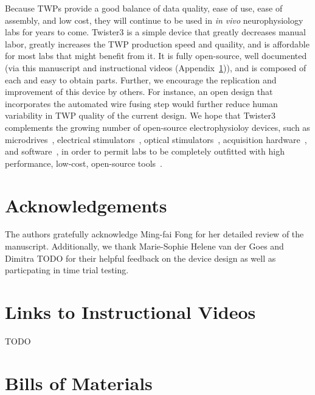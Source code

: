 \documentclass[11pt,a4paper]{article}
\begin{document}
Because TWPs provide a good balance of data quality, ease of use, ease of
assembly, and low cost, they will continue to be used in \textit{in vivo}
neurophysiology labs for years to come. Twister3 is a simple device that
greatly decreases manual labor, greatly increases the TWP production speed and
quaility, and is affordable for most labs that might benefit from it. It is
fully open-source, well documented (via this manuscript and instructional
videos (Appendix~\ref{s:videos})), and is composed of each and easy to obtain
parts. Further, we encourage the replication and improvement of this device by
others. For instance, an open design that incorporates the automated wire
fusing step would further reduce human variability in TWP quality of the
current design. We hope that Twister3 complements the growing number of
open-source electrophysioloy devices, such as microdrives~\cite{Voigts2013},
electrical stimulators~\cite{Cermac2019}, optical stimulators~\cite{Newman2015},
acquisition hardware~\cite{Siegle2017}, and software~\cite{Newman2012b,
Siegle2017, Lopes2015}, in order to permit labs to be completely outfitted with
high performance, low-cost, open-source tools~\cite{Siegle2015}.

\section*{Acknowledgements}
The authors gratefully acknowledge Ming-fai Fong for her detailed review of the
manuscript.  Additionally, we thank Marie-Sophie Helene van der Goes and
Dimitra TODO for their helpful feedback on the device design as well as
particpating in time trial testing.

\medskip




\newpage

\begin{appendices}

\section{Links to Instructional Videos} \label{s:videos}

TODO

\section{Bills of Materials} \label{s:boms}





\end{appendices}
\end{document}
